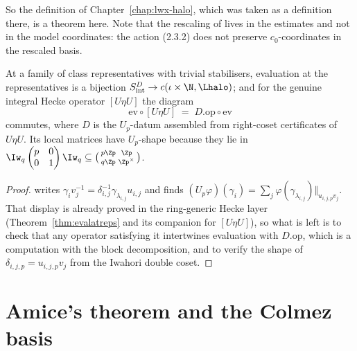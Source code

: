 So the definition of Chapter~\ref{chap:lwx-halo}, which was taken as a definition there, is a
theorem here.  Note that the rescaling of \cite[(5.4.1)]{LWX} lives in the estimates and not in
the model coordinates: the action (2.3.2) does not preserve $c_0$-coordinates in the rescaled
basis.

\begin{theorem}
  \label{thm:prop31}
  \leanok
  At a family of class representatives with trivial stabilisers, evaluation at the
  representatives is a bijection $S^{D}_{\mathrm{int}} \to c(\iota\times\N,\Lhalo)$; and for the
  genuine integral Hecke operator $[U\eta U]$ the diagram
  \[
    \mathrm{ev}\circ[U\eta U] \;=\; D.\mathrm{op}\circ\mathrm{ev}
  \]
  commutes, where $D$ is the $U_p$-datum assembled from right-coset certificates of $U\eta U$.
  Its local matrices have $U_p$-shape because they lie in
  $\Iw_q\begin{pmatrix} p&0\\0&1\end{pmatrix}\Iw_q \subseteq
  \bigl(\begin{smallmatrix} p\Zp&\Zp\\ q\Zp&\Zp^{\times}\end{smallmatrix}\bigr)$.
\end{theorem}

\begin{proof}
  \leanok
  \cite[Proposition 3.1]{LWX} writes $\gamma_i v_j^{-1} = \delta_{i,j}^{-1}\gamma_{\lambda_{i,j}}
  u_{i,j}$ and finds $(U_p\varphi)(\gamma_i) = \sum_j \varphi(\gamma_{\lambda_{i,j}})
  \Vert_{u_{i,j,p}v_j}$.  That display is already proved in the ring-generic Hecke layer
  (Theorem~\ref{thm:evalatreps} and its companion for $[U\eta U]$), so what is left is to check
  that any operator satisfying it intertwines evaluation with $D.\mathrm{op}$, which is a
  computation with the block decomposition, and to verify the shape of
  $\delta_{i,j,p} = u_{i,j,p}v_j$ from the Iwahori double coset.
\end{proof}

\section{Amice's theorem and the Colmez basis}
\label{sec:amice}

